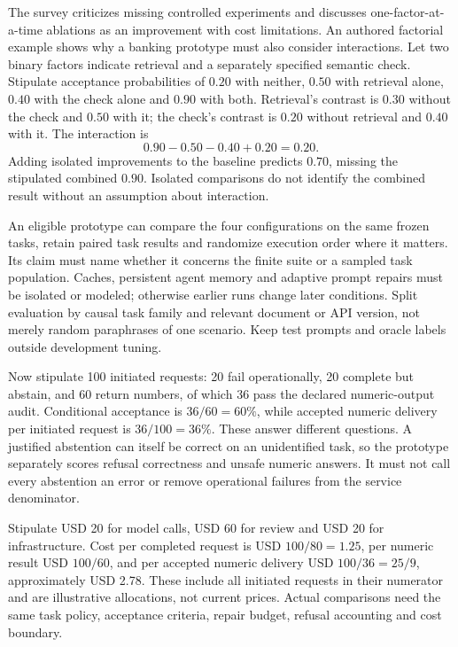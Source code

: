 The survey criticizes missing controlled experiments and discusses
one-factor-at-a-time ablations as an improvement with cost limitations. An
authored factorial example shows why a banking prototype must also consider
interactions. Let two binary factors indicate retrieval and a separately
specified semantic check. Stipulate acceptance probabilities of $0.20$ with
neither, $0.50$ with retrieval alone, $0.40$ with the check alone and $0.90$ with
both. Retrieval's contrast is $0.30$ without the check and $0.50$ with it; the
check's contrast is $0.20$ without retrieval and $0.40$ with it. The interaction is
\[
 0.90-0.50-0.40+0.20=0.20.
\]
Adding isolated improvements to the baseline predicts $0.70$, missing the
stipulated combined $0.90$. Isolated comparisons do not identify the combined
result without an assumption about interaction.
\citep{exec24_llmchallenges_original,exec24_llmchallenges_reference}

An eligible prototype can compare the four configurations on the same frozen
tasks, retain paired task results and randomize execution order where it matters.
Its claim must name whether it concerns the finite suite or a sampled task
population. Caches, persistent agent memory and adaptive prompt repairs must be
isolated or modeled; otherwise earlier runs change later conditions. Split
evaluation by causal task family and relevant document or API version, not merely
random paraphrases of one scenario. Keep test prompts and oracle labels outside
development tuning.

Now stipulate 100 initiated requests: 20 fail operationally, 20 complete but
abstain, and 60 return numbers, of which 36 pass the declared numeric-output
audit. Conditional acceptance is $36/60=60\%$, while accepted numeric delivery
per initiated request is $36/100=36\%$. These answer different questions.
A justified abstention can itself be correct on an unidentified task, so the
prototype separately scores refusal correctness and unsafe numeric answers.
It must not call every abstention an error or remove operational failures from
the service denominator.

Stipulate USD 20 for model calls, USD 60 for review and USD 20 for infrastructure.
Cost per completed request is USD $100/80=1.25$, per numeric result USD $100/60$,
and per accepted numeric delivery USD $100/36=25/9$, approximately USD 2.78.
These include all initiated requests in their numerator and are illustrative
allocations, not current prices. Actual comparisons need the same task policy,
acceptance criteria, repair budget, refusal accounting and cost boundary.
\citep{exec24_llmchallenges_reference}


